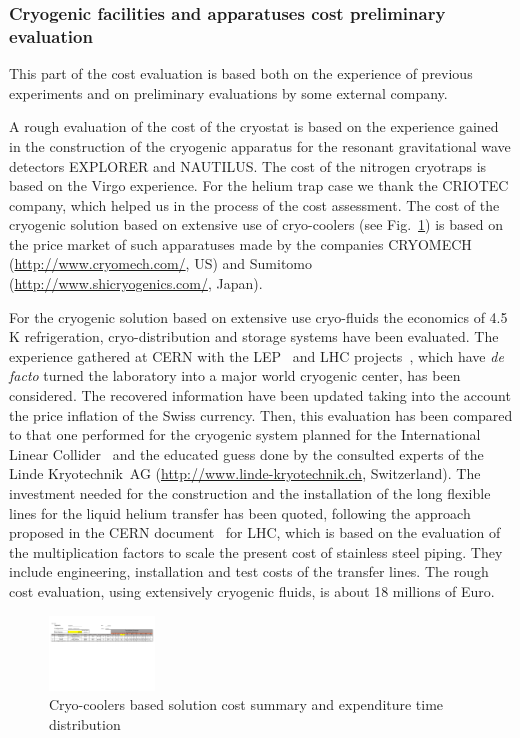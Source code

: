 \subsubsection[Cryogenics costs]{Cryogenic facilities and apparatuses cost preliminary evaluation}
%  
\label{ConclusionsCryoCostsSubSection}
%
This part of the cost evaluation is based both on the experience of previous experiments and on preliminary evaluations by some external company.
\par  
A rough evaluation of the cost of the cryostat is based on the experience gained in the construction of the cryogenic apparatus for the resonant gravitational wave detectors EXPLORER and NAUTILUS.
The cost of the nitrogen cryotraps is based on the Virgo experience. For the helium trap case we thank the CRIOTEC company, which helped us  in  the process of the cost assessment.
The cost of the cryogenic solution based on extensive use of cryo-coolers (see Fig.~\ref{Fig:CryoCoolerCostTable}) is based on the price market of such apparatuses made by the companies CRYOMECH (\url{http://www.cryomech.com/}, US) and  Sumitomo (\url{http://www.shicryogenics.com/}, Japan).
\par 
For the cryogenic solution based on extensive use cryo-fluids the economics of 4.5 K refrigeration, cryo-distribution and storage systems have been evaluated.
The experience gathered at CERN with the LEP~\cite{Kuhn1994467} and LHC projects~\cite{PhilippeLebrunMatefu}, which have \emph{de facto} turned the laboratory into a major world cryogenic center, has been considered. The recovered information have been updated taking into the account the price inflation of the Swiss currency. Then, this evaluation has been compared to that one performed for the cryogenic system planned for the International Linear Collider~\cite{ILCTomPeterson} and the educated guess done by the consulted experts of the Linde Kryotechnik~AG (\url{http://www.linde-kryotechnik.ch}, Switzerland).
The investment needed for the construction and the installation of the long flexible lines for the liquid helium transfer has been quoted, following the approach proposed in the CERN document~\cite{Kuhn:410808,Kuhn1994467,Claudet:410378,PhilippeLebrunMatefu} for LHC, which is based on the evaluation of the multiplication factors to scale the present cost of stainless steel piping. They  include engineering, installation and test  costs of the transfer lines. The rough cost evaluation, using extensively cryogenic fluids, is about 18 millions of Euro. 
%
\FloatBarrier
\begin{figure}[h]
\centering 
\includegraphics[angle=90, width=0.25\textwidth]{Sec_Conclusions/ET-cost-v00r04-CryoCoolers.pdf}
\caption{Cryo-coolers based solution cost summary and expenditure time distribution}
\label{Fig:CryoCoolerCostTable}
\end{figure}

